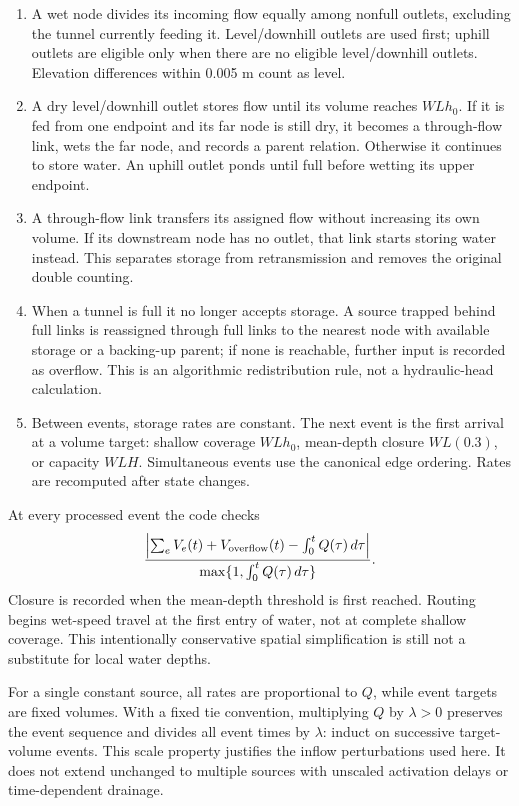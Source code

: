 \documentclass[11pt]{article}
\begin{document}
\begin{enumerate}
\item A wet node divides its incoming flow equally among nonfull outlets, excluding the tunnel currently feeding it. Level/downhill outlets are used first; uphill outlets are eligible only when there are no eligible level/downhill outlets. Elevation differences within 0.005 m count as level.
\item A dry level/downhill outlet stores flow until its volume reaches $WLh_0$. If it is fed from one endpoint and its far node is still dry, it becomes a through-flow link, wets the far node, and records a parent relation. Otherwise it continues to store water. An uphill outlet ponds until full before wetting its upper endpoint.
\item A through-flow link transfers its assigned flow without increasing its own volume. If its downstream node has no outlet, that link starts storing water instead. This separates storage from retransmission and removes the original double counting.
\item When a tunnel is full it no longer accepts storage. A source trapped behind full links is reassigned through full links to the nearest node with available storage or a backing-up parent; if none is reachable, further input is recorded as overflow. This is an algorithmic redistribution rule, not a hydraulic-head calculation.
\item Between events, storage rates are constant. The next event is the first arrival at a volume target: shallow coverage $WLh_0$, mean-depth closure $WL(0.3)$, or capacity $WLH$. Simultaneous events use the canonical edge ordering. Rates are recomputed after state changes.
\end{enumerate}

At every processed event the code checks
\[
 \frac{\left|\sum_e V_e(t)+V_{\rm overflow}(t)-\int_0^tQ(\tau)\,d\tau\right|}
 {\max\{1,\int_0^tQ(\tau)\,d\tau\}}.
\]
Closure is recorded when the mean-depth threshold is first reached. Routing begins wet-speed travel at the first entry of water, not at complete shallow coverage. This intentionally conservative spatial simplification is still not a substitute for local water depths.

For a single constant source, all rates are proportional to $Q$, while event targets are fixed volumes. With a fixed tie convention, multiplying $Q$ by $\lambda>0$ preserves the event sequence and divides all event times by $\lambda$: induct on successive target-volume events. This scale property justifies the inflow perturbations used here. It does not extend unchanged to multiple sources with unscaled activation delays or time-dependent drainage.
\end{document}
